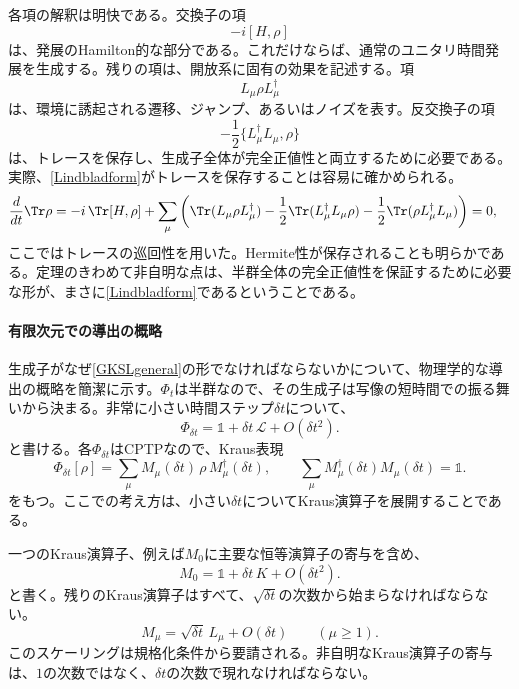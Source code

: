 \documentclass[a4paper,11pt,oneside]{article}
\theoremstyle{definition}
\numberwithin{equation}{section}
\begin{document}
各項の解釈は明快である。交換子の項
\begin{equation}
-i[H,\rho]
\end{equation}
は、発展のHamilton的な部分である。これだけならば、通常のユニタリ時間発展を生成する。残りの項は、開放系に固有の効果を記述する。項
\begin{equation}
L_\mu \rho L_\mu^\dagger
\end{equation}
は、環境に誘起される遷移、ジャンプ、あるいはノイズを表す。反交換子の項
\begin{equation}
-\frac12 \{L_\mu^\dagger L_\mu,\rho\}
\end{equation}
は、トレースを保存し、生成子全体が完全正値性と両立するために必要である。実際、\eqref{Lindbladform}がトレースを保存することは容易に確かめられる。
\begin{align}
\frac{d}{dt}\Tr\rho
&=
-i\,\Tr[H,\rho]
+
\sum_\mu
\left(
\Tr(L_\mu \rho L_\mu^\dagger)
-\frac12 \Tr(L_\mu^\dagger L_\mu \rho)
-\frac12 \Tr(\rho L_\mu^\dagger L_\mu)
\right)=
0 ,
\end{align}
ここではトレースの巡回性を用いた。Hermite性が保存されることも明らかである。定理のきわめて非自明な点は、半群全体の完全正値性を保証するために必要な形が、まさに\eqref{Lindbladform}であるということである。



\paragraph{有限次元での導出の概略} 生成子がなぜ\eqref{GKSLgeneral}の形でなければならないかについて、物理学的な導出の概略を簡潔に示す。$\Phi_t$は半群なので、その生成子は写像の短時間での振る舞いから決まる。非常に小さい時間ステップ$\delta t$について、
\begin{equation}
\Phi_{\delta t} = \mathds{1}  + \delta t\,\mathcal L + O(\delta t^2) .
\end{equation}
と書ける。各$\Phi_{\delta t}$はCPTPなので、Kraus表現
\begin{equation}
\Phi_{\delta t}[\rho]
=
\sum_\mu M_\mu(\delta t)\,\rho\,M_\mu^\dagger(\delta t) ,
\qquad
\sum_\mu M_\mu^\dagger(\delta t) M_\mu(\delta t)=\mathds{1}  .
\end{equation}
をもつ。ここでの考え方は、小さい$\delta t$についてKraus演算子を展開することである。



一つのKraus演算子、例えば$M_0$に主要な恒等演算子の寄与を含め、
\begin{equation}
M_0 = \mathds{1}  + \delta t\,K + O(\delta t^2) .
\end{equation}
と書く。残りのKraus演算子はすべて、$\sqrt{\delta t}$の次数から始まらなければならない。
\begin{equation}
M_\mu = \sqrt{\delta t}\,L_\mu + O(\delta t)
\qquad (\mu\ge 1) .
\end{equation}
このスケーリングは規格化条件から要請される。非自明なKraus演算子の寄与は、$1$の次数ではなく、$\delta t$の次数で現れなければならない。
\end{document}
